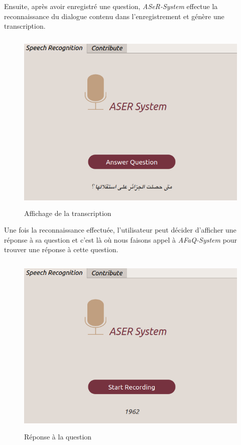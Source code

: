  Ensuite, après avoir enregistré une question, \textit{ASeR-System} effectue la reconnaissance du dialogue contenu dans l'enregistrement et génère une transcription.  
 
\begin{figure}[H]
     \centering
     \includegraphics[height=250pt,width=430pt]{images/chap4/transcript_decoded.png}
     \caption{Affichage de la transcription}
     \label{}
 \end{figure}
 
Une fois la reconnaissance effectuée, l'utilisateur peut décider d'afficher une réponse à sa question et c'est là où nous faisons appel à \textit{AFaQ-System} pour trouver une réponse à cette question.
 
\begin{figure}[H]
     \centering
     \includegraphics[height=250pt,width=430pt]{images/chap4/answer.png}
     \caption{Réponse à la question}
     \label{}
 \end{figure}
 

